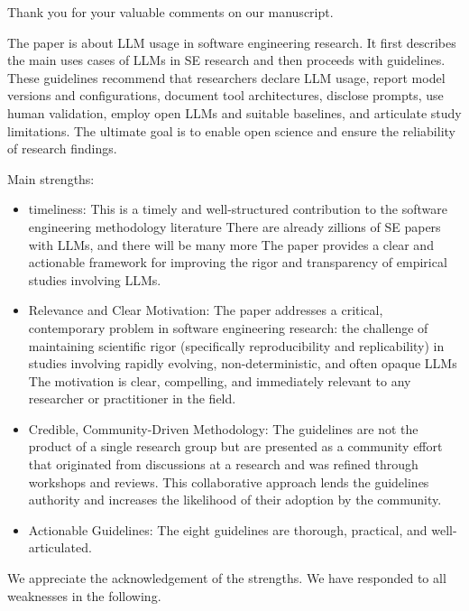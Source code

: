 \documentclass[12pt,english]{reviewresponse}
\begin{document}
\begin{concludingresponse}[]
	Thank you for your valuable comments on our manuscript. 
\end{concludingresponse}



\reviewer
\label{rev:2}
\begin{generalcomment}
The paper is about LLM usage in software engineering research. It first describes the main uses cases of LLMs in SE research and then proceeds with guidelines. These guidelines recommend that researchers declare LLM usage, report model versions and configurations, document tool architectures, disclose prompts, use human validation, employ open LLMs and suitable baselines, and articulate study limitations. The ultimate goal is to enable open science and ensure the reliability of research findings.

Main strengths:
\begin{itemize}
    \item timeliness: This is a timely and well-structured contribution to the software engineering methodology literature There are already zillions of SE papers with LLMs, and there will be many more The paper provides a clear and actionable framework for improving the rigor and transparency of empirical studies involving LLMs.
    \item Relevance and Clear Motivation: The paper addresses a critical, contemporary problem in software engineering research: the challenge of maintaining scientific rigor (specifically reproducibility and replicability) in studies involving rapidly evolving, non-deterministic, and often opaque LLMs The motivation is clear, compelling, and immediately relevant to any researcher or practitioner in the field.
    \item Credible, Community-Driven Methodology: The guidelines are not the product of a single research group but are presented as a community effort that originated from discussions at a research  and was refined through workshops and reviews. This collaborative approach lends the guidelines authority and increases the likelihood of their adoption by the community.
    \item Actionable Guidelines: The eight guidelines are thorough, practical, and well-articulated.
\end{itemize}
\end{generalcomment}
\begin{revresponse}
	We appreciate the acknowledgement of the strengths. We have responded to all weaknesses in the following.
\end{revresponse}
\end{document}
